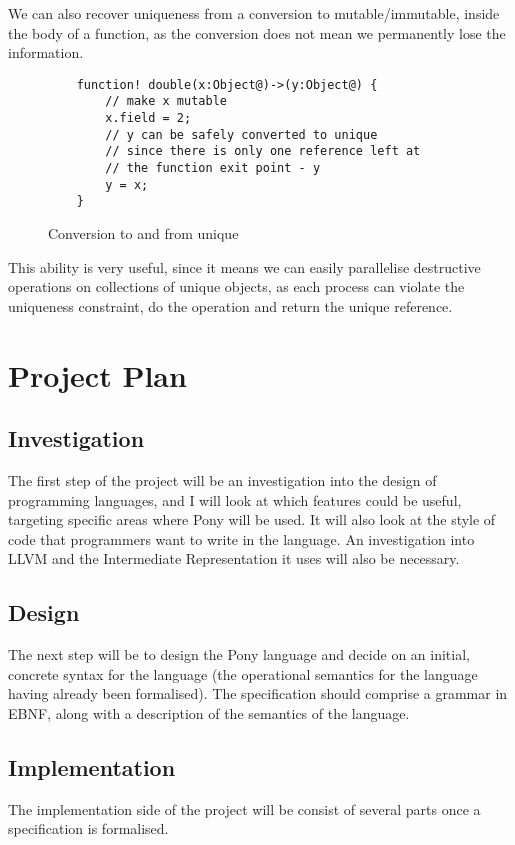 \documentclass{article}
\begin{document}
We can also recover uniqueness from a conversion to mutable/immutable, inside the body of a function, as the conversion does not mean we permanently lose the information.

\begin{figure}[H]
\begin{verbatim}
    function! double(x:Object@)->(y:Object@) {
        // make x mutable
        x.field = 2;
        // y can be safely converted to unique
        // since there is only one reference left at
        // the function exit point - y
        y = x;
    }
\end{verbatim}
\caption{Conversion to and from unique}
\end{figure}

This ability is very useful, since it means we can easily parallelise destructive operations on collections of unique objects, as each process can violate the uniqueness constraint, do the operation and return the unique reference.

\section{Project Plan}

\subsection{Investigation}
The first step of the project will be an investigation into the design of programming languages, and I will look at which features could be useful, targeting specific areas where Pony will be used.
It will also look at the style of code that programmers want to write in the language.
An investigation into LLVM and the Intermediate Representation it uses will also be necessary.

\subsection{Design}
The next step will be to design the Pony language and decide on an initial, concrete syntax for the language (the operational semantics for the language having already been formalised).
The specification should comprise a grammar in EBNF, along with a description of the semantics of the language.

\subsection{Implementation}
The implementation side of the project will be consist of several parts once a specification is formalised.
\end{document}
